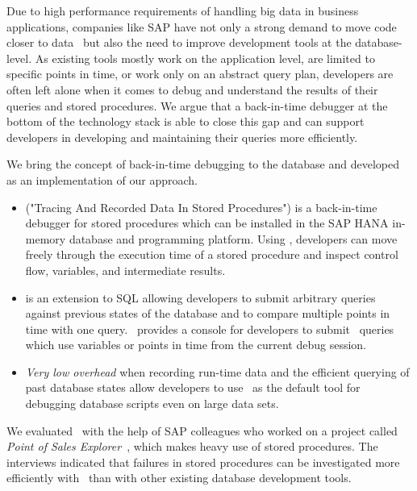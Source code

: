 Due to high performance requirements of handling big data in business applications, companies like SAP have not only a strong demand to move code closer to data~\cite{plattner15:the_in-memory_revolution_how} but also the need to improve development tools at the database-level. 
As existing tools mostly work on the application level, are limited to specific points in time, or work only on an abstract query plan, developers are often left alone when it comes to debug and understand the results of their queries and stored procedures.
We argue that a back-in-time debugger at the bottom of the technology stack is able to close this gap and can support developers in developing and maintaining their queries more efficiently. 
\tmpEnd

\tmpStart

We bring the concept of back-in-time debugging to the database and developed \emph{\tool} as an implementation of our approach.

\begin{itemize}
	\item \emph{\tool} ("Tracing And Recorded Data In Stored Procedures") is a back-in-time debugger for stored procedures which can be installed in the SAP HANA in-memory database and programming platform.
		Using \tool, developers can move freely through the execution time of a stored procedure and inspect control flow, variables, and intermediate results.
	
	\item \emph{\SQLextension} is an extension to SQL allowing developers to submit arbitrary queries against previous states of the database 
		and to compare multiple points in time with one query.
		\tool\ provides a console for developers to submit \SQLextension\ queries which use variables or points in time from the current debug session.

	\item \emph{Very low overhead} when recording run-time data and the efficient querying of past database states allow developers to use \tool\ as the default tool for debugging database scripts even on large data sets.
	
\end{itemize}

We evaluated \tool\ with the help of SAP colleagues who worked on a project called \emph{Point of Sales Explorer}~\cite{plattner15:the_in-memory_revolution_how}, which makes heavy use of stored procedures. 
The interviews indicated that failures in stored procedures can be investigated more efficiently with \tool\ than with other existing database development tools.

